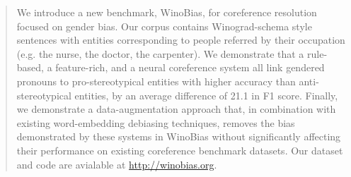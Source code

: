 \begin{abstract}


We introduce a new benchmark, WinoBias, for coreference resolution focused on gender bias.
Our corpus contains Winograd-schema style sentences with entities corresponding to people referred by their occupation (e.g. the nurse, the doctor, the carpenter).
We demonstrate that a rule-based, a feature-rich, and a neural coreference system all link gendered pronouns to pro-stereotypical entities with higher accuracy than anti-stereotypical entities, by an average difference of 21.1 in F1 score.
Finally, we demonstrate a data-augmentation approach that, in combination with existing word-embedding debiasing techniques, removes the bias demonstrated by these systems in WinoBias without significantly affecting their performance on existing coreference benchmark datasets.
Our dataset and code are avialable at \url{http://winobias.org}.

\end{abstract}